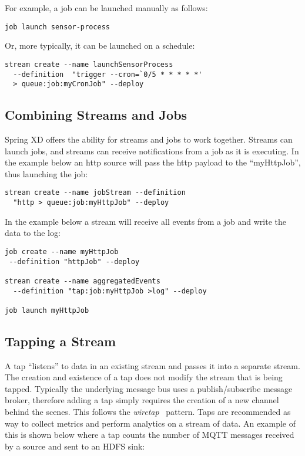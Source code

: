 For example, a job can be launched manually as follows:

\begin{lstlisting}
job launch sensor-process
\end{lstlisting}

Or, more typically, it can be launched on a schedule:

\begin{lstlisting}
stream create --name launchSensorProcess
  --definition  "trigger --cron=`0/5 * * * * *'
  > queue:job:myCronJob" --deploy
\end{lstlisting}

\subsection {Combining Streams and Jobs}

Spring XD offers the ability for streams and jobs to work together. Streams
can launch jobs, and streams can receive notifications from a job
as it is executing.  In the example below an http source will pass the http
payload to the ``myHttpJob'', thus launching the job:

\begin{lstlisting}
stream create --name jobStream --definition
  "http > queue:job:myHttpJob" --deploy
\end{lstlisting}

In the example below a stream will receive all events from a job and write
the data to the log:

\begin{lstlisting}
job create --name myHttpJob
 --definition "httpJob" --deploy

stream create --name aggregatedEvents
  --definition "tap:job:myHttpJob >log" --deploy

job launch myHttpJob
\end{lstlisting}

\subsection {Tapping a Stream} \label{sssec:deploytap}

A tap ``listens'' to data in an existing stream and passes it into a separate
stream. The creation and existence of a tap does not modify the stream that
is being tapped. Typically the underlying message bus uses a publish/subscribe
message broker, therefore adding a tap simply requires the creation of
a new channel behind the scenes. This follows the \emph{wiretap}~\cite{wiretap}
pattern.  Taps are recommended as way to collect metrics and perform
analytics on a stream of data. An example of this is shown below where a
tap counts the number of MQTT messages received by a source and sent to an
HDFS sink:

